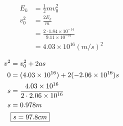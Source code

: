 \begin{enumerate}
    \begin{minipage}{0.5\textwidth}
    \begin{align*}
        E_{k}&=\frac{1}{2}mv_{0}^{2}\\
        v_{0}^{2}&=\frac{2E_{k}}{m}\\
        &=\frac{2\cdot1.84\times10^{-14}}{9.11\times10^{-31}}\\
        &= 4.03\times10^{16}(m/s)^{2}
    \end{align*}
    \end{minipage}
    \hfill
    \begin{minipage}{0.5\textwidth}
    \begin{align*}
        v^{2}&=v_{0}^{2}+2as\\
        0 &= (4.03\times10^{16})+2(-2.06\times10^{16})s\\
        s &= \frac{4.03\times10^{16}}{2\cdot2.06\times10^{16}}\\
        s &= 0.978 m\\
        &\fbox{$s = 97.8cm$}
    \end{align*}
    \end{minipage}
    
\end{enumerate}

